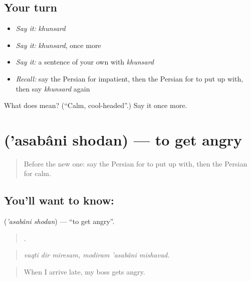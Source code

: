 \subsection*{Your turn}
\begin{itemize}
\raggedright
  \item \emph{Say it:} \emph{khunsard}
  \item \emph{Say it:} \emph{khunsard}, once more
  \item \emph{Say it:} a sentence of your own with \emph{khunsard}
  \item \emph{Recall:} say the Persian for impatient, then the Persian for to put up with, then say \emph{khunsard} again
\end{itemize}

\begin{tcolorbox}[breakable,colback=teal!4,colframe=teal!35!black,title={Before you move on}]
What does  mean? (\textquotedblleft{}Calm, cool-headed\textquotedblright{}.) Say it once more.
\end{tcolorbox}
\section[\texorpdfstring{\fa{عصبانی} \fa{شدن} ('asabâni shodan)}{عصبانی شدن ('asabâni shodan)}]{  ('asabâni shodan) — to get angry}

\label{lesson:FA-C481-asabani-shodan}



\begin{quote}
Before the new one: say the Persian for to put up with, then the Persian for calm.
\end{quote}

\subsection*{You'll want to know:  }
\textbf{ } (\emph{'asabâni shodan}) — \textquotedblleft{}to get angry\textquotedblright{}.

\begin{quote}
     .
\end{quote}

\begin{quote}
\emph{vaqti dir miresam, modiram 'asabâni mishavad.}
\end{quote}

\begin{quote}
When I arrive late, my boss gets angry.
\end{quote}

